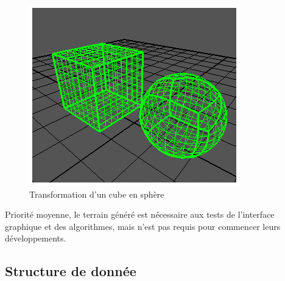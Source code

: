\documentclass[12pt]{report}
\begin{document}
\begin{center}
\begin{figure}[!h]
  \includegraphics[scale=1]{img/Cubetosphere.png}
  \caption{Transformation d'un cube en sphère \cite{Cube2Sphere}}
  \label{fig:Cubetosphere}
\end{figure}
\end{center}

Priorité moyenne, le terrain généré est nécessaire aux tests de
l'interface graphique et des algorithmes, mais n'est pas requis pour
commencer leurs développements.\\


\subsection{Structure de donnée}
\end{document}
